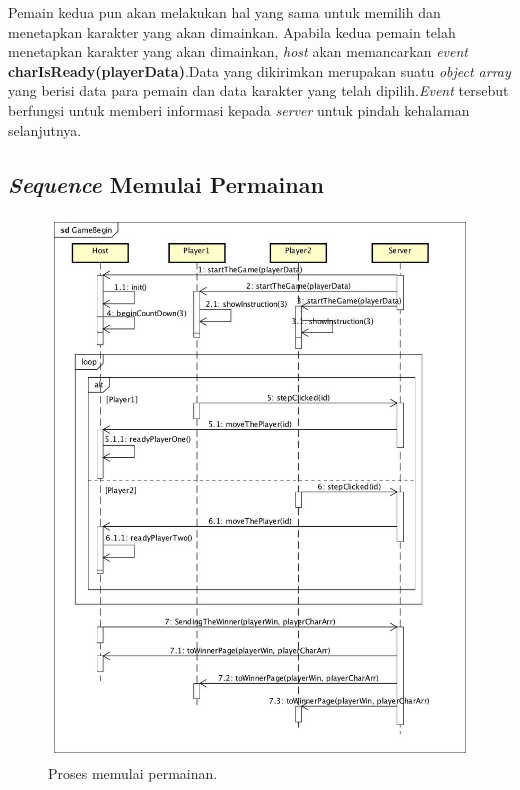 Pemain kedua pun akan melakukan hal yang sama untuk memilih dan menetapkan karakter yang akan dimainkan. Apabila kedua pemain telah menetapkan karakter yang akan dimainkan, \textit{host} akan memancarkan \textit{event} \textbf{charIsReady(playerData)}.Data yang dikirimkan merupakan suatu \textit{object array} yang berisi data para pemain dan data karakter yang telah dipilih.\textit{Event} tersebut berfungsi untuk memberi informasi kepada \textit{server} untuk pindah kehalaman selanjutnya.

\subsection{\textit{Sequence} Memulai Permainan}

\begin{figure}[H]
	\centering
	\includegraphics[scale=0.33]{Gambar/GameBegin}
	\caption{Proses memulai permainan.}
	\label{fig:3_GameBegin}
\end{figure}

